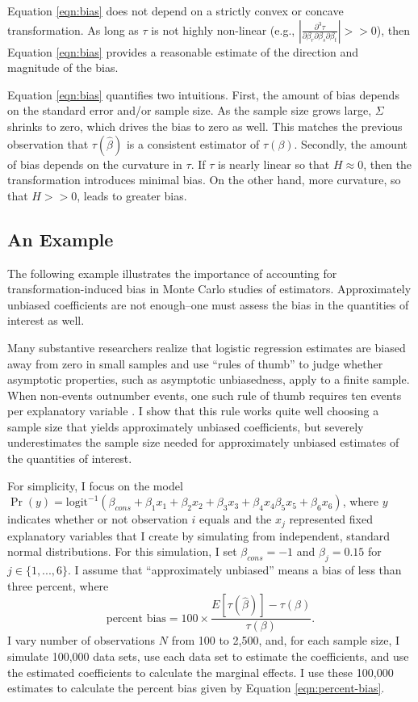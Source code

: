 \documentclass[12pt]{article}
\begin{document}
Equation \ref{eqn:bias} does not depend on a strictly convex or concave transformation. 
As long as $\tau$ is not highly non-linear (e.g., $\left|\frac{\partial^3 \tau}{\partial \beta_r \partial \beta_s \partial \beta_t}\right| >> 0$), then Equation \ref{eqn:bias} provides a reasonable estimate of the direction and magnitude of the bias.

Equation \ref{eqn:bias} quantifies two intuitions. 
First, the amount of bias depends on the standard error and/or sample size. 
As the sample size grows large, $\Sigma$ shrinks to zero, which drives the bias to zero as well. 
This matches the previous observation that $\tau(\hat{\beta})$ is a consistent estimator of $\tau(\beta)$. 
Secondly, the amount of bias depends on the curvature in $\tau$. 
If $\tau$ is nearly linear so that $H \approx 0$, then the transformation introduces minimal bias. 
On the other hand, more curvature, so that $H >> 0$, leads to greater bias. 

\subsection*{An Example}

The following example illustrates the importance of accounting for transformation-induced bias in Monte Carlo studies of estimators. 
Approximately unbiased coefficients are not enough--one must assess the bias in the quantities of interest as well. 

Many substantive researchers realize that logistic regression estimates are biased away from zero in small samples and use ``rules of thumb'' to judge whether asymptotic properties, such as asymptotic unbiasedness, apply to a finite sample.
When non-events outnumber events, one such rule of thumb requires ten events per explanatory variable \citep{Peduzzietal1996}.
I show that this rule works quite well choosing a sample size that yields approximately unbiased coefficients, but severely underestimates the sample size needed for approximately unbiased estimates of the quantities of interest.

For simplicity, I focus on the model $\Pr (y) = \text{logit}^{-1}(\beta_{cons} + \beta_1x_1 + \beta_2x_2 + \beta_3x_3 + \beta_4x_4 \beta_5x_5 + \beta_6x_6)$, where $y$ indicates whether or not observation $i$ equals and the $x_j$ represented fixed explanatory variables that I create by simulating from independent, standard normal distributions. 
For this simulation, I set $\beta_{cons} = -1$ and $\beta_j =  0.15$ for $j \in \{1, ..., 6\}$. 
I assume that ``approximately unbiased'' means a bias of less than three percent, where
\begin{equation}\label{eqn:percent-bias}
\text{percent bias} = 100 \times \frac{E[\tau(\hat{\beta})] - \tau(\beta)}{\tau(\beta)}\text{.}
\end{equation}
I vary number of observations $N$ from 100 to 2,500, and, for each sample size, I simulate 100,000 data sets, use each data set to estimate the coefficients, and use the estimated coefficients to calculate the marginal effects.
I use these 100,000 estimates to calculate the percent bias given by Equation \ref{eqn:percent-bias}.
\end{document}
